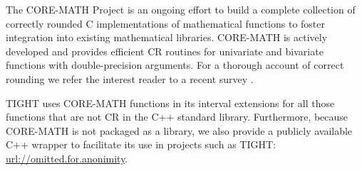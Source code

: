 The CORE-MATH Project \cite{Sibidanov2022} is an ongoing effort to build a complete collection of correctly rounded C implementations of mathematical functions to foster integration into existing mathematical libraries. 
CORE-MATH is actively developed and provides efficient CR routines for univariate and bivariate functions with double-precision arguments.
For a thorough account of correct rounding we refer the interest reader to a recent survey \cite{CRsurvey}.

TIGHT uses CORE-MATH functions in its interval extensions for all those functions that are not CR in the C++ standard library.
Furthermore, because CORE-MATH is not packaged as a library, we also provide a publicly available C++ wrapper to facilitate its use in projects such as TIGHT: \url{url://omitted.for.anonimity}.
